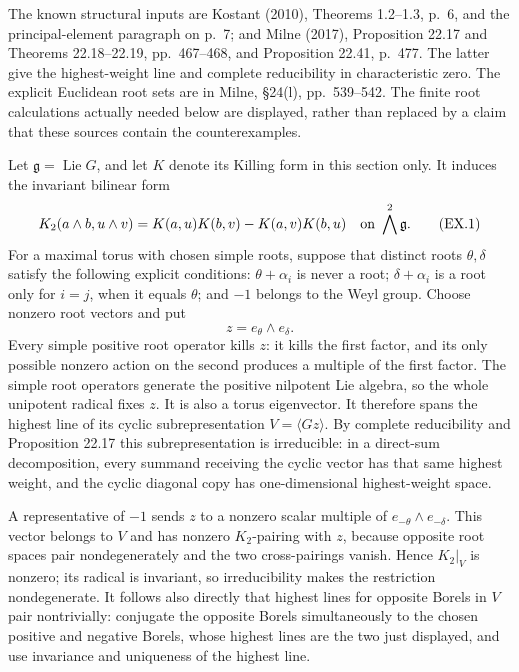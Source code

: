 \documentclass[11pt,a4paper]{article}
\theoremstyle{definition}\newtheorem{definition}[theorem]{Definition}
\theoremstyle{remark}\newtheorem{remark}[theorem]{Remark}
\begin{document}
The known structural inputs are Kostant (2010), Theorems 1.2--1.3,
p.~6, and the principal-element paragraph on p.~7; and Milne (2017),
Proposition 22.17 and Theorems 22.18--22.19, pp.~467--468,
and Proposition 22.41, p.~477.  The latter give the highest-weight
line and complete reducibility in characteristic zero.  The explicit
Euclidean root sets are in Milne, \S24(l), pp.~539--542.  The finite
root calculations actually needed below are displayed, rather than
replaced by a claim that these sources contain the counterexamples.

Let $\mathfrak g=\operatorname{Lie}G$, and let $K$ denote its Killing
form in this section only.  It induces the invariant bilinear form
\[
 K_2(a\wedge b,u\wedge v)
       =K(a,u)K(b,v)-K(a,v)K(b,u)
       \quad\hbox{on }\bigwedge^2\mathfrak g.
 \tag{EX.1}
\]
For a maximal torus with chosen simple roots, suppose that distinct
roots $\theta,\delta$ satisfy the following explicit conditions:
$\theta+\alpha_i$ is never a root; $\delta+\alpha_i$ is a root
only for $i=j$, when it equals $\theta$; and $-1$ belongs to the
Weyl group.  Choose nonzero root vectors and put
\[
                         z=e_\theta\wedge e_\delta.
\]
Every simple positive root operator kills $z$: it kills the first
factor, and its only possible nonzero action on the second produces
a multiple of the first factor.  The simple root operators generate
the positive nilpotent Lie algebra, so the whole unipotent radical
fixes $z$.  It is also a torus eigenvector.  It therefore spans the
highest line of its cyclic subrepresentation $V=\langle Gz\rangle$.
By complete reducibility and Proposition 22.17 this subrepresentation
is irreducible: in a direct-sum decomposition, every summand receiving
the cyclic vector has that same highest weight, and the cyclic
diagonal copy has one-dimensional highest-weight space.

A representative of $-1$ sends $z$ to a nonzero scalar multiple of
$e_{-\theta}\wedge e_{-\delta}$.  This vector belongs to $V$ and
has nonzero $K_2$-pairing with $z$, because opposite root spaces pair
nondegenerately and the two cross-pairings vanish.  Hence $K_2|_V$
is nonzero; its radical is invariant, so irreducibility makes the
restriction nondegenerate.  It follows also directly that highest
lines for opposite Borels in $V$ pair nontrivially: conjugate the
opposite Borels simultaneously to the chosen positive and negative
Borels, whose highest lines are the two just displayed, and use
invariance and uniqueness of the highest line.
\end{document}
